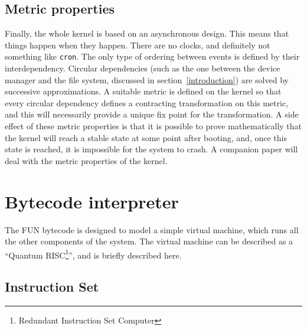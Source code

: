 \documentclass[12pt,titlepage,a4paper,twoside]{article}
\begin{document}
\subsection{Metric properties}
\label{overall design philosophy:metric properties}
Finally, the whole kernel is based on an asynchronous design. This means that
things happen when they happen. There are no clocks, and definitely not
something like {\tt cron}. The only type of ordering between events is
defined by their interdependency. Circular dependencies (such as the one
between the device manager and the file system, discussed in
section~\ref{introduction}) are solved by successive approximations. A
suitable metric is defined on the kernel so that every circular dependency
defines a contracting transformation on this metric, and this will necessarily
provide a unique fix point for the transformation. A side effect of these
metric properties is that it is possible to prove mathematically that the
kernel will reach a stable state at some point after booting, and, once
this state is reached, it is impossible for the system to crash. A companion
paper will deal with the metric properties of the kernel.


\section{Bytecode interpreter}
\label{bytecode interpreter}

The FUN bytecode is designed to model a simple virtual machine, which runs
all the other components of the system. The virtual machine can be described
as a ``Quantum RISC\footnote{Redundant Instruction Set Computer}'', and is
briefly described here.

\subsection{Instruction Set}
\label{bytecode interpreter:instruction set}
\end{document}
